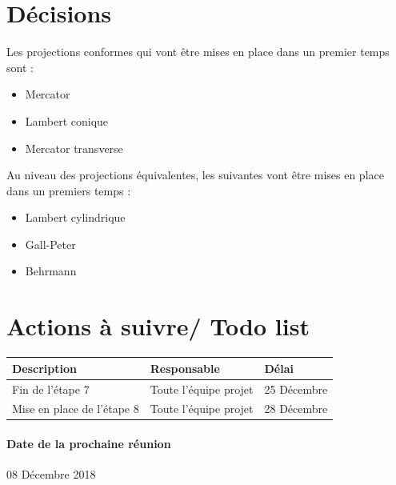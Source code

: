 \documentclass{article}
\begin{document}
\section{Décisions}
Les projections conformes qui vont être mises en place dans un premier temps sont : 
\begin{itemize}
  \item Mercator 
  \item Lambert conique 
  \item Mercator transverse 
\end{itemize}

Au niveau des projections équivalentes, les suivantes vont être mises en place dans un premiers temps :
\begin{itemize}
  \item Lambert cylindrique 
  \item Gall-Peter
  \item Behrmann 
\end{itemize}

\section{Actions à suivre/ Todo list}

\begin{tabular}{|C{5cm}|C{3cm}|C{3cm}|}
\hline {} Description & Responsable & Délai \\
\hline  Fin de l'étape 7 & Toute l'équipe projet  & 25 Décembre  \\
\hline 
Mise en place de l'étape 8 & Toute l'équipe projet  & 28 Décembre \\
\hline
\end{tabular}

\paragraph{Date de la prochaine réunion}
08 Décembre 2018
\end{document}
